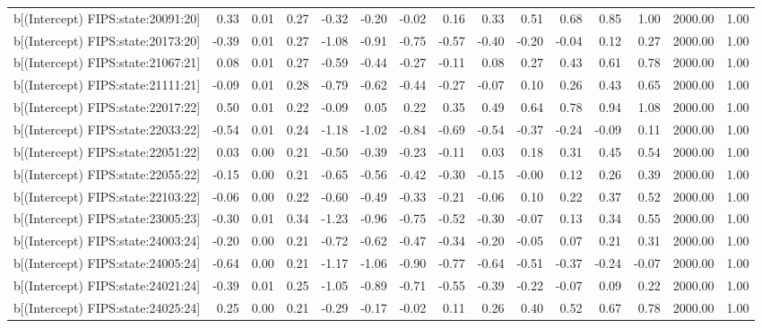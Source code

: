 \begin{table}[ht]
\begin{tabular}{rrrrrrrrrrrrrrr}
  b[(Intercept) FIPS:state:20091:20] & 0.33 & 0.01 & 0.27 & -0.32 & -0.20 & -0.02 & 0.16 & 0.33 & 0.51 & 0.68 & 0.85 & 1.00 & 2000.00 & 1.00 \\ 
  b[(Intercept) FIPS:state:20173:20] & -0.39 & 0.01 & 0.27 & -1.08 & -0.91 & -0.75 & -0.57 & -0.40 & -0.20 & -0.04 & 0.12 & 0.27 & 2000.00 & 1.00 \\ 
  b[(Intercept) FIPS:state:21067:21] & 0.08 & 0.01 & 0.27 & -0.59 & -0.44 & -0.27 & -0.11 & 0.08 & 0.27 & 0.43 & 0.61 & 0.78 & 2000.00 & 1.00 \\ 
  b[(Intercept) FIPS:state:21111:21] & -0.09 & 0.01 & 0.28 & -0.79 & -0.62 & -0.44 & -0.27 & -0.07 & 0.10 & 0.26 & 0.43 & 0.65 & 2000.00 & 1.00 \\ 
  b[(Intercept) FIPS:state:22017:22] & 0.50 & 0.01 & 0.22 & -0.09 & 0.05 & 0.22 & 0.35 & 0.49 & 0.64 & 0.78 & 0.94 & 1.08 & 2000.00 & 1.00 \\ 
  b[(Intercept) FIPS:state:22033:22] & -0.54 & 0.01 & 0.24 & -1.18 & -1.02 & -0.84 & -0.69 & -0.54 & -0.37 & -0.24 & -0.09 & 0.11 & 2000.00 & 1.00 \\ 
  b[(Intercept) FIPS:state:22051:22] & 0.03 & 0.00 & 0.21 & -0.50 & -0.39 & -0.23 & -0.11 & 0.03 & 0.18 & 0.31 & 0.45 & 0.54 & 2000.00 & 1.00 \\ 
  b[(Intercept) FIPS:state:22055:22] & -0.15 & 0.00 & 0.21 & -0.65 & -0.56 & -0.42 & -0.30 & -0.15 & -0.00 & 0.12 & 0.26 & 0.39 & 2000.00 & 1.00 \\ 
  b[(Intercept) FIPS:state:22103:22] & -0.06 & 0.00 & 0.22 & -0.60 & -0.49 & -0.33 & -0.21 & -0.06 & 0.10 & 0.22 & 0.37 & 0.52 & 2000.00 & 1.00 \\ 
  b[(Intercept) FIPS:state:23005:23] & -0.30 & 0.01 & 0.34 & -1.23 & -0.96 & -0.75 & -0.52 & -0.30 & -0.07 & 0.13 & 0.34 & 0.55 & 2000.00 & 1.00 \\ 
  b[(Intercept) FIPS:state:24003:24] & -0.20 & 0.00 & 0.21 & -0.72 & -0.62 & -0.47 & -0.34 & -0.20 & -0.05 & 0.07 & 0.21 & 0.31 & 2000.00 & 1.00 \\ 
  b[(Intercept) FIPS:state:24005:24] & -0.64 & 0.00 & 0.21 & -1.17 & -1.06 & -0.90 & -0.77 & -0.64 & -0.51 & -0.37 & -0.24 & -0.07 & 2000.00 & 1.00 \\ 
  b[(Intercept) FIPS:state:24021:24] & -0.39 & 0.01 & 0.25 & -1.05 & -0.89 & -0.71 & -0.55 & -0.39 & -0.22 & -0.07 & 0.09 & 0.22 & 2000.00 & 1.00 \\ 
  b[(Intercept) FIPS:state:24025:24] & 0.25 & 0.00 & 0.21 & -0.29 & -0.17 & -0.02 & 0.11 & 0.26 & 0.40 & 0.52 & 0.67 & 0.78 & 2000.00 & 1.00 \\ 

\end{tabular}
\end{table}
